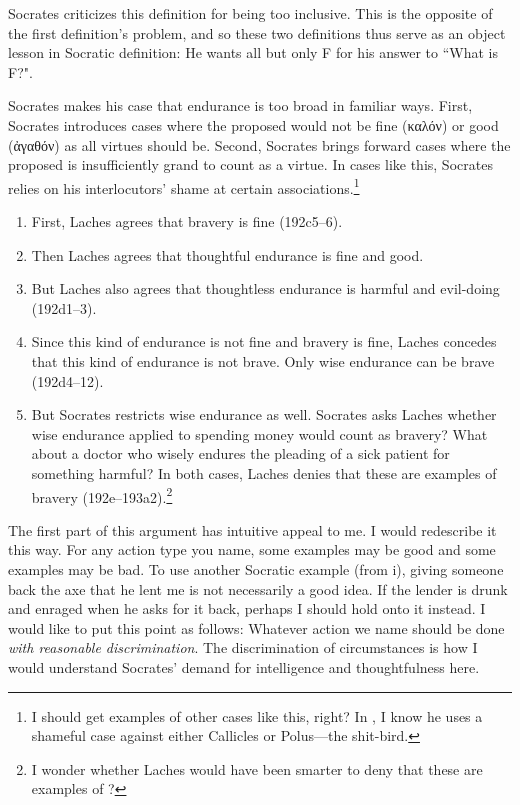 \documentclass[11pt]{article}
\begin{document}
Socrates criticizes this definition for being too inclusive.  This is the
opposite of the first definition's problem, and so these two definitions thus
serve as an object lesson in Socratic definition: He wants all but only F for
his answer to ``What is F?".

Socrates makes his case that endurance is too broad in familiar ways.  First,
Socrates introduces cases where the proposed  would not be
fine ({\g καλόν}) or good ({\g ἀγαθόν}) as all virtues should be. Second,
Socrates brings forward cases where the proposed  is
insufficiently grand to count as a virtue.  In cases like this, Socrates relies
on his interlocutors' shame at certain associations.\footnote{I should get
examples of other cases like this, right?  In , I know he uses
a shameful case against either Callicles or Polus---the shit-bird.}

\begin{enumerate}

    \item First, Laches agrees that bravery is fine (192c5--6).

    \item Then Laches agrees that thoughtful endurance is fine and good.

    \item But Laches also agrees that thoughtless endurance is harmful and
        evil-doing (192d1--3).

    \item Since this kind of endurance is not fine and bravery is fine, Laches
        concedes that this kind of endurance is not brave.  Only wise endurance
        can be brave (192d4--12).

    \item But Socrates restricts wise endurance as well.  Socrates asks Laches
        whether wise endurance applied to spending money would count as
        bravery?  What about a doctor who wisely endures the pleading of a sick
        patient for something harmful?  In both cases, Laches denies that these
        are examples of bravery (192e--193a2).\footnote{I wonder whether Laches
        would have been smarter to deny that these are examples of
        ?}

\end{enumerate}

The first part of this argument has intuitive appeal to me.  I would redescribe
it this way.  For any action type you name, some examples may be good and some
examples may be bad.  To use another Socratic example (from  i),
giving someone back the axe that he lent me is not necessarily a good idea.  If
the lender is drunk and enraged when he asks for it back, perhaps I should hold
onto it instead.  I would like to put this point as follows: Whatever action we
name should be done \emph{with reasonable discrimination}.  The discrimination
of circumstances is how I would understand Socrates' demand for intelligence
and thoughtfulness here.
\end{document}
